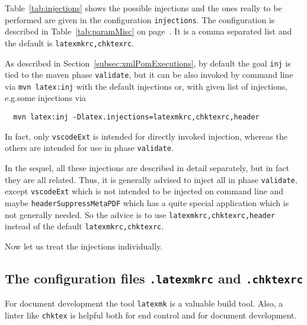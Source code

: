 Table~\ref{tab:injections} shows the possible injections 
and the ones really to be performed are given in the configuration \texttt{injections}. 
The configuration is described in Table~\ref{tab:paramMisc} on page~\pageref{tab:paramMisc}. 
It is a comma separated list and the default is \texttt{latexmkrc,chktexrc}. 

As described in Section~\ref{subsec:xmlPomExecutions}, 
by default the goal \texttt{inj} is tied to the maven phase \texttt{validate}, 
but it can be also invoked by command line via \texttt{mvn latex:inj} 
with the default injections or, with given list of injections, 
e.g.\@ some injections via 
%
\begin{Verbatim}
  mvn latex:inj -Dlatex.injections=latexmkrc,chktexrc,header
\end{Verbatim}
%
In fact, only \texttt{vscodeExt} is intended for directly invoked injection, 
whereas the others are intended for use in phase \texttt{validate}. 

In the sequel, all these injections are described in detail separately, 
but in fact they are all related. 
Thus, it is generally advised to inject all in phase \texttt{validate}, 
except \texttt{vscodeExt} which is not intended to be injected on command line 
and maybe \texttt{headerSuppressMetaPDF} which has a quite special application 
which is not generally needed. 
So the advice is to use \texttt{latexmkrc,chktexrc,header} 
instead of the default \texttt{latexmkrc,chktexrc}. 



Now let us treat the injections individually. 



\subsection{The configuration files \texttt{.latexmkrc} and \texttt{.chktexrc}}\label{subsec:latChkRc}

For document development the tool \texttt{latexmk} is a valuable build tool. 
Also, a linter like \texttt{chktex} is helpful 
both for end control and for document development. 

